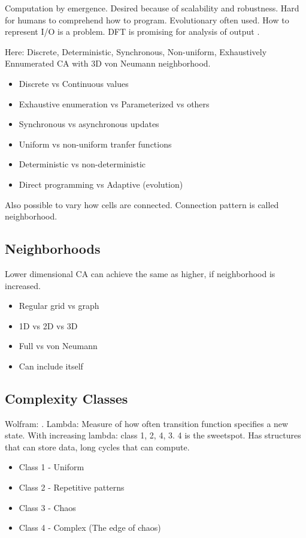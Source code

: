 \TODO
Computation by emergence.
Desired because of scalability and robustness.
Hard for humans to comprehend how to program.
Evolutionary often used.
How to represent I/O is a problem.
DFT is promising for analysis of output \cite{berg2013ca}.

\TODO
Here: Discrete, Deterministic, Synchronous, Non-uniform, Exhaustively Ennumerated CA with 3D von Neumann neighborhood.

\begin{itemize}
    \item Discrete vs Continuous values
    \item Exhaustive enumeration vs Parameterized vs others
    \item Synchronous vs asynchronous updates
    \item Uniform vs non-uniform tranfer functions
    \item Deterministic vs non-deterministic
    \item Direct programming vs Adaptive (evolution)
\end{itemize}

\TODO
Also possible to vary how cells are connected.
Connection pattern is called neighborhood.

\subsection{Neighborhoods}

\TODO
Lower dimensional CA can achieve the same as higher, if neighborhood is increased.

\begin{itemize}
    \item Regular grid vs graph
    \item 1D vs 2D vs 3D
    \item Full vs von Neumann
    \item Can include itself
\end{itemize}

\subsection{Complexity Classes}

\TODO
Wolfram: \cite{wolfram1984complexity}.
Lambda: Measure of how often transition function specifies a new state.
With increasing lambda: class 1, 2, 4, 3.
4 is the sweetspot.
Has structures that can store data, long cycles that can compute.

\begin{itemize}
    \item Class 1 - Uniform
    \item Class 2 - Repetitive patterns
    \item Class 3 - Chaos
    \item Class 4 - Complex (The edge of chaos)
\end{itemize}

